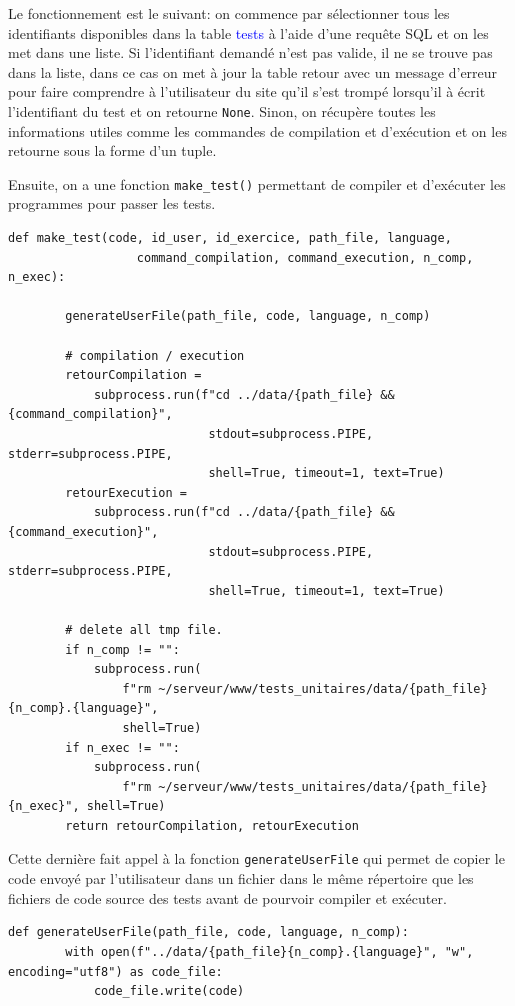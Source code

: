 \documentclass[a4paper]{article}
\renewcommand{\texttt}[2][blue]{\textcolor{#1}{\ttfamily #2}}
\begin{document}
  Le fonctionnement est le suivant: on commence par sélectionner tous les
  identifiants disponibles dans la table \texttt{tests} à l'aide d'une requête
  SQL et on les met dans une liste.  Si l'identifiant demandé n'est pas valide,
  il ne se trouve pas dans la liste, dans ce cas on met à jour la table retour
  avec un message d'erreur pour faire comprendre à l'utilisateur du site qu'il
  s'est trompé lorsqu'il à écrit l'identifiant du test et on retourne
  \lstinline{None}. Sinon, on récupère toutes les informations utiles comme les
  commandes de compilation et d'exécution et on les retourne sous la forme d'un
  tuple.

  Ensuite, on a une fonction \lstinline{make_test()} permettant de compiler et
  d'exécuter les programmes pour passer les tests.

  \begin{lstlisting}[language=PY]%
    def make_test(code, id_user, id_exercice, path_file, language,
                  command_compilation, command_execution, n_comp, n_exec):

        generateUserFile(path_file, code, language, n_comp)

        # compilation / execution
        retourCompilation =
            subprocess.run(f"cd ../data/{path_file} && {command_compilation}",
                            stdout=subprocess.PIPE, stderr=subprocess.PIPE,
                            shell=True, timeout=1, text=True)
        retourExecution =
            subprocess.run(f"cd ../data/{path_file} && {command_execution}",
                            stdout=subprocess.PIPE, stderr=subprocess.PIPE,
                            shell=True, timeout=1, text=True)

        # delete all tmp file.
        if n_comp != "":
            subprocess.run(
                f"rm ~/serveur/www/tests_unitaires/data/{path_file}{n_comp}.{language}",
                shell=True)
        if n_exec != "":
            subprocess.run(
                f"rm ~/serveur/www/tests_unitaires/data/{path_file}{n_exec}", shell=True)
        return retourCompilation, retourExecution
  \end{lstlisting}

  Cette dernière fait appel à la fonction \lstinline{generateUserFile} qui
  permet de copier le code envoyé par l'utilisateur dans un fichier dans le
  même répertoire que les fichiers de code source des tests avant de pourvoir
  compiler et exécuter.

  \begin{lstlisting}[language=PY]%
    def generateUserFile(path_file, code, language, n_comp):
        with open(f"../data/{path_file}{n_comp}.{language}", "w", encoding="utf8") as code_file:
            code_file.write(code)
  \end{lstlisting}
\end{document}
